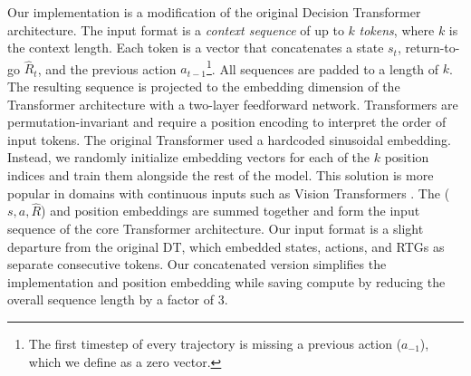 
 \noindent Our implementation is a modification of the original Decision Transformer architecture. The input format is a \textit{context sequence} of up to $k$ \textit{tokens}, where $k$ is the context length. Each token is a vector that concatenates a state $s_t$, return-to-go $\hat{R}_t$, and the previous action $a_{t-1}$\footnote{The first timestep of every trajectory is missing a previous action ($a_{-1}$), which we define as a zero vector.}. All sequences are padded to a length of $k$. The resulting sequence is projected to the embedding dimension of the Transformer architecture with a two-layer feedforward network. Transformers are permutation-invariant and require a position encoding to interpret the order of input tokens. The original Transformer \cite{transformer} used a hardcoded sinusoidal embedding. Instead, we randomly initialize embedding vectors for each of the $k$ position indices and train them alongside the rest of the model. This solution is more popular in domains with continuous inputs such as Vision Transformers \cite{dosovitskiy2020image}. The ($s, a, \hat{R}$) and position embeddings are summed together and form the input sequence of the core Transformer architecture. Our input format is a slight departure from the original DT, which embedded states, actions, and RTGs as separate consecutive tokens. Our concatenated version simplifies the implementation and position embedding while saving compute by reducing the overall sequence length by a factor of $3$.
 
 
